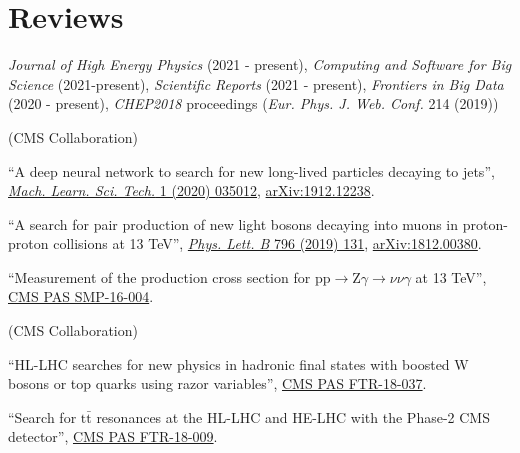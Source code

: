 \section{Reviews}
\begin{description}[leftmargin=12pt,font=\normalfont\textit]
\item[Journal referee:]
\begin{description}[leftmargin=12pt,font=\normalfont,labelsep=0em]\item[]
\item \emph{Journal of High Energy Physics} (2021 - present), \emph{Computing and Software for Big Science} (2021-present), \emph{Scientific Reports} (2021 - present), \emph{Frontiers in Big Data} (2020 - present), \emph{CHEP2018} proceedings (\emph{Eur. Phys. J. Web. Conf.} 214 (2019))
\end{description}
\item[Analysis Review Committee (ARC) member:] (CMS Collaboration)
\begin{description}[leftmargin=12pt,font=\normalfont,labelsep=0em]
\item ``A deep neural network to search for new long-lived particles decaying to jets'', \href{https://doi.org/10.1088/2632-2153/ab9023}{\emph{Mach. Learn. Sci. Tech.} 1 (2020) 035012}, \href{https://arxiv.org/abs/1912.12238}{arXiv:1912.12238}.
\item \begin{sloppypar}``A search for pair production of new light bosons decaying into muons in proton-proton collisions at 13 TeV'', \href{http://dx.doi.org/10.1016/j.physletb.2019.07.013}{\emph{Phys. Lett. B} 796 (2019) 131}, \href{https://arxiv.org/abs/1812.00380}{arXiv:1812.00380}.\end{sloppypar}
\item ``Measurement of the production cross section for $\text{p}\text{p} \to \text{Z}\gamma \to \nu\nu\gamma$ at 13 TeV'', \href{https://cds.cern.ch/record/2204922}{CMS PAS SMP-16-004}.
\end{description}
\item[CMS Certified Language Editor (CCLE):] (CMS Collaboration)
\begin{description}[leftmargin=12pt,font=\normalfont,labelsep=0em]
\item ``HL-LHC searches for new physics in hadronic final states with boosted W bosons or top quarks using razor variables'', \href{https://cds.cern.ch/record/2658262}{CMS PAS FTR-18-037}.
\item ``Search for $\text{t}\bar{\text{t}}$ resonances at the HL-LHC and HE-LHC with the Phase-2 CMS detector'', \href{https://cds.cern.ch/record/2649032}{CMS PAS FTR-18-009}.

\end{description}
\end{description}
